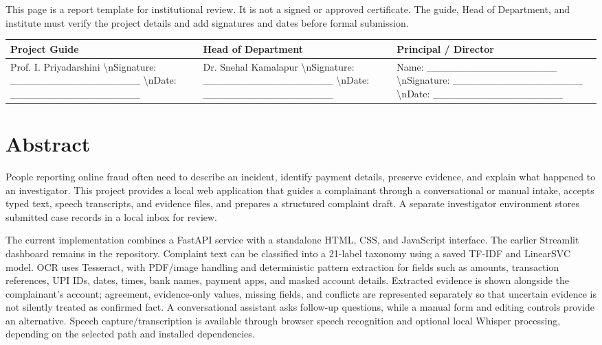 \documentclass[12pt,a4paper,oneside]{report}
\begin{document}
This page is a report template for institutional review. It is not a signed or approved certificate. The guide, Head of Department, and institute must verify the project details and add signatures and dates before formal submission.

\begin{longtable}{p{}p{}p{}}
\toprule
\textbf{Project Guide} & \textbf{Head of Department} & \textbf{Principal / Director} \\
\midrule
Prof. I. Priyadarshini  \textbackslash{}nSignature: \_\_\_\_\_\_\_\_\_\_\_\_\_\_\_\_\_\_  \textbackslash{}nDate: \_\_\_\_\_\_\_\_\_\_\_\_\_\_\_\_\_\_ & Dr. Snehal Kamalapur  \textbackslash{}nSignature: \_\_\_\_\_\_\_\_\_\_\_\_\_\_\_\_\_\_  \textbackslash{}nDate: \_\_\_\_\_\_\_\_\_\_\_\_\_\_\_\_\_\_ & Name: \_\_\_\_\_\_\_\_\_\_\_\_\_\_\_\_\_\_  \textbackslash{}nSignature: \_\_\_\_\_\_\_\_\_\_\_\_\_\_\_\_\_\_  \textbackslash{}nDate: \_\_\_\_\_\_\_\_\_\_\_\_\_\_\_\_\_\_ \\
\bottomrule
\end{longtable}
\clearpage\chapter*{Abstract}
People reporting online fraud often need to describe an incident, identify payment details, preserve evidence, and explain what happened to an investigator. This project provides a local web application that guides a complainant through a conversational or manual intake, accepts typed text, speech transcripts, and evidence files, and prepares a structured complaint draft. A separate investigator environment stores submitted case records in a local inbox for review.

The current implementation combines a FastAPI service with a standalone HTML, CSS, and JavaScript interface. The earlier Streamlit dashboard remains in the repository. Complaint text can be classified into a 21-label taxonomy using a saved TF-IDF and LinearSVC model. OCR uses Tesseract, with PDF/image handling and deterministic pattern extraction for fields such as amounts, transaction references, UPI IDs, dates, times, bank names, payment apps, and masked account details. Extracted evidence is shown alongside the complainant's account; agreement, evidence-only values, missing fields, and conflicts are represented separately so that uncertain evidence is not silently treated as confirmed fact. A conversational assistant asks follow-up questions, while a manual form and editing controls provide an alternative. Speech capture/transcription is available through browser speech recognition and optional local Whisper processing, depending on the selected path and installed dependencies.
\end{document}
